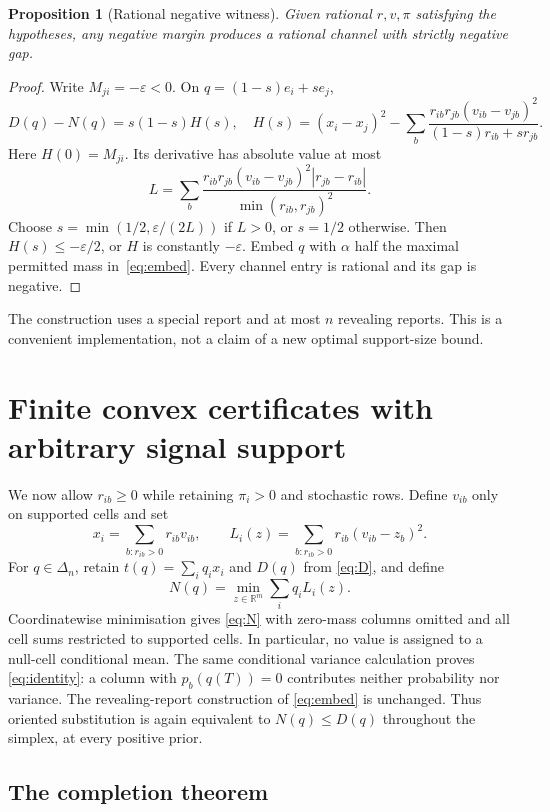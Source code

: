 \documentclass[11pt,a4paper]{article}
\newtheorem{proposition}[theorem]{Proposition}
\begin{document}
\begin{proposition}[Rational negative witness]\label{prop:witness}
Given rational $r,v,\pi$ satisfying the hypotheses, any negative margin produces a rational channel with strictly negative gap.
\end{proposition}
\begin{proof}
Write $M_{ji}=-\varepsilon<0$. On $q=(1-s)e_i+se_j$,
\[
 D(q)-N(q)=s(1-s)H(s),\quad
 H(s)=(x_i-x_j)^2-
 \sum_b\frac{r_{ib}r_{jb}(v_{ib}-v_{jb})^2}{(1-s)r_{ib}+sr_{jb}}.
\]
Here $H(0)=M_{ji}$. Its derivative has absolute value at most
\[
 L=\sum_b\frac{r_{ib}r_{jb}(v_{ib}-v_{jb})^2|r_{jb}-r_{ib}|}
 {\min(r_{ib},r_{jb})^2}.
\]
Choose $s=\min(1/2,\varepsilon/(2L))$ if $L>0$, or $s=1/2$ otherwise. Then $H(s)\leq-\varepsilon/2$, or $H$ is constantly $-\varepsilon$. Embed $q$ with $\alpha$ half the maximal permitted mass in~\eqref{eq:embed}. Every channel entry is rational and its gap is negative.
\end{proof}
The construction uses a special report and at most $n$ revealing reports. This is a convenient implementation, not a claim of a new optimal support-size bound.

\section{Finite convex certificates with arbitrary signal support}
\label{sec:completion}
We now allow $r_{ib}\geq0$ while retaining $\pi_i>0$ and stochastic rows.
Define $v_{ib}$ only on supported cells and set
\[
 x_i=\sum_{b:r_{ib}>0}r_{ib}v_{ib},\qquad
 L_i(z)=\sum_{b:r_{ib}>0}r_{ib}(v_{ib}-z_b)^2.
\]
For $q\in\Delta_n$, retain $t(q)=\sum_iq_ix_i$ and $D(q)$ from
\eqref{eq:D}, and define
\begin{equation}\label{eq:completion-N}
 N(q)=\min_{z\in\mathbb R^m}\sum_iq_iL_i(z).
\end{equation}
Coordinatewise minimisation gives \eqref{eq:N} with zero-mass columns
omitted and all cell sums restricted to supported cells. In particular,
no value is assigned to a null-cell conditional mean. The same
conditional variance calculation proves \eqref{eq:identity}: a column
with $p_b(q(T))=0$ contributes neither probability nor variance.
The revealing-report construction of \eqref{eq:embed} is unchanged.
Thus oriented substitution is again equivalent to $N(q)\leq D(q)$
throughout the simplex, at every positive prior.

\subsection{The completion theorem}
\end{document}
